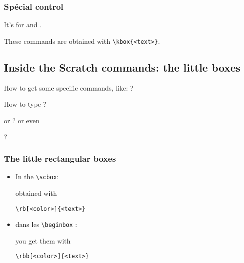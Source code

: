 \documentclass[a4paper,11pt]{article}
\begin{document}
\subsubsection{Spécial control}%
It's for \hspace{-1cm} and \hspace{-1cm}.

These commands are obtained with \texttt{\textbackslash kbox\{<text>\}}.

\subsection{Inside the Scratch commands: the little boxes}
How to get some specific commands, like: \hspace{-1cm}?

How to type \hspace{-1cm}?

or \hspace{-1cm}? or even

\hspace{-1cm} ?

\subsubsection{The little rectangular boxes}%
\begin{itemize}
\item In the \texttt{\textbackslash scbox}:

obtained with

\texttt{\textbackslash rb[<color>]\{<text>\}}\\

\item dans les \texttt{\textbackslash beginbox} :

you get them with

\texttt{\textbackslash rbb[<color>]\{<text>\}}\\
\end{itemize}
\end{document}
